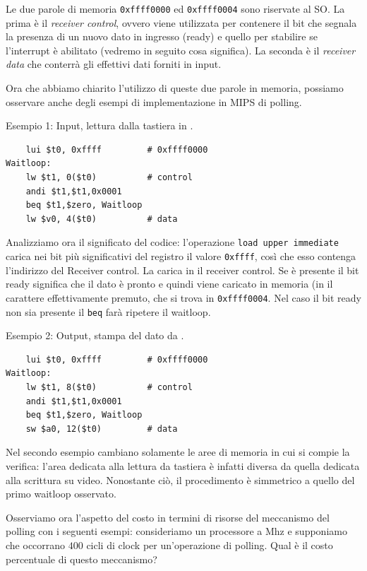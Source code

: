 \documentclass[class=book, crop=false, oneside]{standalone}
\begin{document}
Le due parole di memoria \texttt{0xffff0000} ed \texttt{0xffff0004} sono riservate al SO.
La prima è il \emph{receiver control}, ovvero viene utilizzata per contenere il bit che segnala la presenza di un nuovo dato in ingresso (ready) e quello per stabilire se l'interrupt è abilitato (vedremo in seguito cosa significa). La seconda è il \emph{receiver data} che conterrà gli effettivi dati forniti in input.

Ora che abbiamo chiarito l'utilizzo di queste due parole in memoria, possiamo osservare anche degli esempi di implementazione in MIPS di polling.

Esempio 1: Input, lettura dalla tastiera in .
\begin{verbatim}
	lui $t0, 0xffff         # 0xffff0000
Waitloop:
	lw $t1, 0($t0)          # control
	andi $t1,$t1,0x0001
	beq $t1,$zero, Waitloop
	lw $v0, 4($t0)          # data
\end{verbatim}
Analizziamo ora il significato del codice: l'operazione \texttt{load upper immediate} carica nei bit più significativi del registro  il valore \texttt{0xffff}, così che esso contenga l'indirizzo del Receiver control. La  carica in  il receiver control. Se è presente il bit ready significa che il dato è pronto e quindi viene caricato in memoria (in  il carattere effettivamente premuto, che si trova in \texttt{0xffff0004}. Nel caso il bit ready non sia presente il \texttt{beq} farà ripetere il waitloop.

Esempio 2: Output, stampa del dato da .
\begin{verbatim}
	lui $t0, 0xffff         # 0xffff0000
Waitloop:
	lw $t1, 8($t0)          # control
	andi $t1,$t1,0x0001
	beq $t1,$zero, Waitloop
	sw $a0, 12($t0)         # data
\end{verbatim}
Nel secondo esempio cambiano solamente le aree di memoria in cui si compie la verifica: l'area dedicata alla lettura da tastiera è infatti diversa da quella dedicata alla scrittura su video. Nonostante ciò, il procedimento è simmetrico a quello del primo waitloop osservato.

Osserviamo ora l'aspetto del costo in termini di risorse del meccanismo del polling con i seguenti esempi: consideriamo un processore a \unit[500]{Mhz} e supponiamo che occorrano \(400\) cicli di clock per un'operazione di polling. Qual è il costo percentuale di questo meccanismo?
\end{document}

